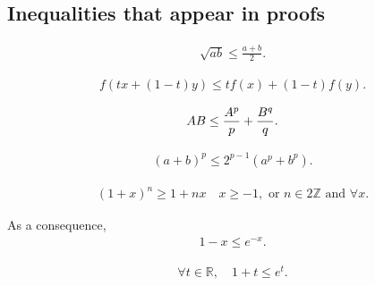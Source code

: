 \hypertarget{inequalities-that-appear-in-proofs}{%
\subsection{Inequalities that appear in
proofs}\label{inequalities-that-appear-in-proofs}}

\begin{proposition}[AM-GM Inequality]

\begin{align*}
\sqrt{ab} \leq \frac{a+b}{2}
.\end{align*}

\end{proposition}

\begin{proposition}

\begin{align*}
f(tx + (1-t)y) \leq tf(x) + (1-t)f(y)
.\end{align*}

\end{proposition}

\begin{proposition}

\begin{align*}
AB \leq {A^p \over p} + {B^q \over q}
.\end{align*}

\end{proposition}

\begin{proposition}[?]

\begin{align*}
(a+b)^p \leq 2^{p-1} (a^p + b^p)
.\end{align*}

\end{proposition}

\begin{proposition}

\begin{align*}
(1 + x)^n \geq 1 +nx \quad x\geq -1, \text{ or } n\in 2{\mathbb{Z}}\text{ and } \forall x
.\end{align*}

As a consequence,
\begin{align*}
1-x \leq e^{-x}
.\end{align*}

\end{proposition}

\begin{proposition}

\begin{align*}  
\forall t\in {\mathbb{R}},\quad 1 + t \leq  e^t
.\end{align*}

\end{proposition}

